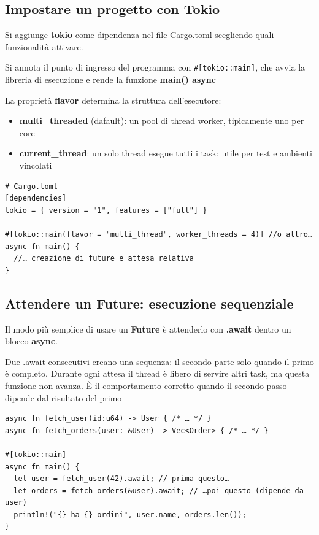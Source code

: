 \subsection{Impostare un progetto con Tokio}
Si aggiunge \textbf{tokio} come dipendenza nel file Cargo.toml scegliendo quali
funzionalità attivare.

Si annota il punto di ingresso del programma con \verb|#[tokio::main]|, che avvia la libreria di
esecuzione e rende la funzione \textbf{main() async}

La proprietà \textbf{flavor} determina la struttura dell'esecutore:

\begin{itemize}
  \item \textbf{multi\_threaded} (dafault): un pool di thread worker, tipicamente uno per core
  \item \textbf{current\_thread}: un solo thread esegue tutti i task; utile per test e ambienti vincolati
\end{itemize}


\begin{verbatim}
# Cargo.toml
[dependencies]
tokio = { version = "1", features = ["full"] }

#[tokio::main(flavor = "multi_thread", worker_threads = 4)] //o altro…
async fn main() {
  //… creazione di future e attesa relativa
}
\end{verbatim}

\subsection{Attendere un Future: esecuzione sequenziale}

Il modo più semplice di usare un \textbf{Future} è attenderlo con \textbf{.await} dentro un blocco
\textbf{async}.

Due .await consecutivi creano una sequenza: il secondo parte solo quando il primo è completo.
Durante ogni attesa il thread è libero di servire altri task, ma questa funzione non avanza.
È il comportamento corretto quando il secondo passo dipende dal risultato del primo

\begin{verbatim}
async fn fetch_user(id:u64) -> User { /* … */ }
async fn fetch_orders(user: &User) -> Vec<Order> { /* … */ }

#[tokio::main]
async fn main() {
  let user = fetch_user(42).await; // prima questo…
  let orders = fetch_orders(&user).await; // …poi questo (dipende da user)
  println!("{} ha {} ordini", user.name, orders.len());
}
\end{verbatim}


